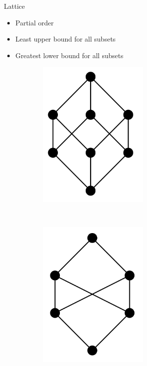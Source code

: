 \begin{frame}{Lattice}
  \begin{itemize}
  \item Partial order 
  \item Least upper bound for all subsets
  \item Greatest lower bound for all subsets
  \end{itemize}


  \begin{figure}
    \begin{subfigure}[b]{0.4\textwidth}
      \includegraphics[width=0.6\textwidth]{graphics/lattice}
    \end{subfigure}
    ~
    \begin{subfigure}[b]{0.4\textwidth}
      \includegraphics[width=0.6\textwidth]{graphics/notlattice}
    \end{subfigure}    
  \end{figure}
\end{frame}

